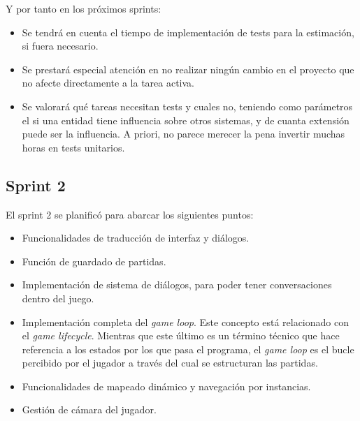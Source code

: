 Y por tanto en los próximos sprints:
\begin{itemize}
    \item Se tendrá en cuenta el tiempo de implementación de tests para la estimación, si fuera necesario.
    \item Se prestará especial atención en no realizar ningún cambio en el proyecto que no afecte directamente a la tarea activa.
    \item Se valorará qué tareas necesitan tests y cuales no, teniendo como parámetros el si una entidad tiene influencia sobre otros sistemas, y de cuanta extensión puede ser la influencia. A priori, no parece merecer la pena invertir muchas horas en tests unitarios.
\end{itemize}

\subsection{Sprint 2}

El sprint 2 se planificó para abarcar los siguientes puntos:

\begin{itemize}
    \item Funcionalidades de traducción de interfaz y diálogos.
    \item Función de guardado de partidas.
    \item Implementación de sistema de diálogos, para poder tener conversaciones dentro del juego.
    \item Implementación completa del \textit{game loop}. Este concepto está relacionado con el \textit{game lifecycle}. Mientras que este último es un término técnico que hace referencia a los estados por los que pasa el programa, el \textit{game loop} es el bucle percibido por el jugador a través del cual se estructuran las partidas.
    \item Funcionalidades de mapeado dinámico y navegación por instancias.
    \item Gestión de cámara del jugador.
\end{itemize}

